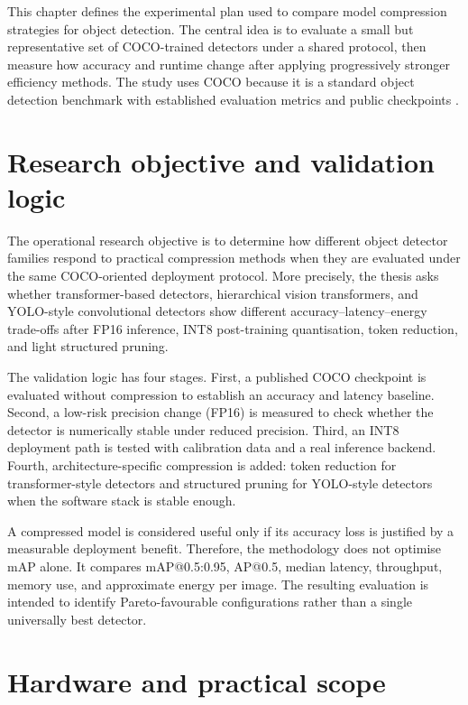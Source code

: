 \documentclass[a4paper,11pt,twoside]{report}
\theoremstyle{definition}
\begin{document}
This chapter defines the experimental plan used to compare model compression strategies for object detection. The central idea is to evaluate a small but representative set of COCO-trained detectors under a shared protocol, then measure how accuracy and runtime change after applying progressively stronger efficiency methods. The study uses COCO because it is a standard object detection benchmark with established evaluation metrics and public checkpoints \cite{Lin2014COCO}.

\section{Research objective and validation logic}

The operational research objective is to determine how different object detector families respond to practical compression methods when they are evaluated under the same COCO-oriented deployment protocol. More precisely, the thesis asks whether transformer-based detectors, hierarchical vision transformers, and YOLO-style convolutional detectors show different accuracy--latency--energy trade-offs after FP16 inference, INT8 post-training quantisation, token reduction, and light structured pruning.

The validation logic has four stages. First, a published COCO checkpoint is evaluated without compression to establish an accuracy and latency baseline. Second, a low-risk precision change (FP16) is measured to check whether the detector is numerically stable under reduced precision. Third, an INT8 deployment path is tested with calibration data and a real inference backend. Fourth, architecture-specific compression is added: token reduction for transformer-style detectors and structured pruning for YOLO-style detectors when the software stack is stable enough.

A compressed model is considered useful only if its accuracy loss is justified by a measurable deployment benefit. Therefore, the methodology does not optimise mAP alone. It compares mAP@0.5:0.95, AP@0.5, median latency, throughput, memory use, and approximate energy per image. The resulting evaluation is intended to identify Pareto-favourable configurations rather than a single universally best detector.

\section{Hardware and practical scope}
\end{document}

